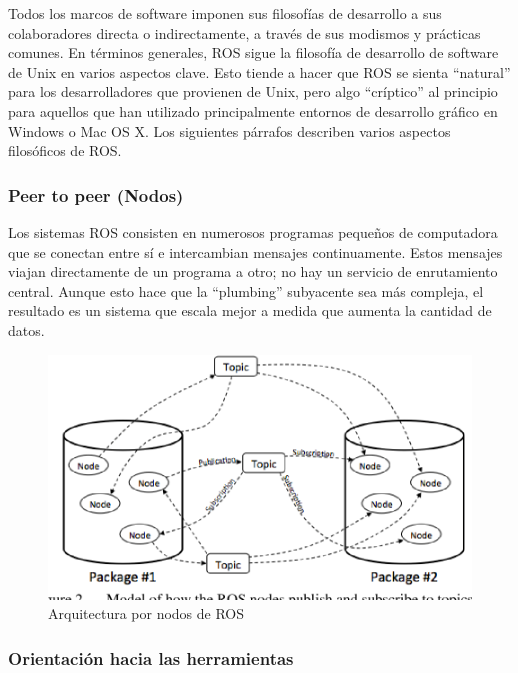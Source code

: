         Todos los marcos de software imponen sus filosofías de desarrollo a sus colaboradores directa o indirectamente, a través de sus modismos y prácticas comunes. En términos generales, ROS sigue la filosofía de desarrollo de software de Unix en varios aspectos clave. Esto tiende a hacer que ROS se sienta ``natural'' para los desarrolladores que provienen de Unix, pero algo ``críptico'' al principio para aquellos que han utilizado principalmente entornos de desarrollo gráfico en Windows o Mac OS X. Los siguientes párrafos describen varios aspectos filosóficos de ROS.
        
        \subsubsection{Peer to peer (Nodos)}
        
            Los sistemas ROS consisten en numerosos programas pequeños de computadora que se conectan entre sí e intercambian mensajes continuamente. Estos mensajes viajan directamente de un programa a otro; no hay un servicio de enrutamiento central. Aunque esto hace que la ``plumbing'' subyacente sea más compleja, el resultado es un sistema que escala mejor a medida que aumenta la cantidad de datos.
            
            \begin{figure}[htb]
                \centering
                \includegraphics[width=0.9\linewidth]{Main/Chapter3/Images3/3-5/arquitectura-ros.png}
                \caption{Arquitectura por nodos de ROS}
                \label{f:Cap3-5_arquitectura_ros}
            \end{figure}
            
        \subsubsection{Orientación hacia las herramientas}
        
